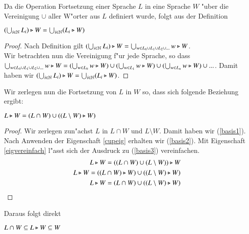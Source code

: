 Da die Operation Fortsetzung einer Sprache $L$ in eine Sprache $W$ "uber die Vereinigung $\cup$ aller W"orter aus $L$ definiert wurde, folgt aus der Definition

\vspace{2ex}

\begin{eigen}\label{cupeig}
$(\bigcup_{i\in\mathbb{N}} L_i) \triangleright W = \bigcup_{i\in\mathbb{N}} (L_i\triangleright W)$
\end{eigen}
\begin{proof} 
Nach Definition gilt $(\bigcup_{i\in\mathbb{N}} L_i) \triangleright W = \bigcup_{w\in L_0\cup L_1\cup L_2 \cup ... } w\triangleright W$.\\
Wir betrachten nun die Vereinigung f"ur jede Sprache, so dass $\bigcup_{w\in L_0\cup L_1\cup L_2 \cup ...} w\triangleright W = (\bigcup_{w\in L_0} w\triangleright W) \cup (\bigcup_{w\in L_1} w\triangleright W) \cup (\bigcup_{w\in L_n} w\triangleright W) \cup ...$. Damit haben wir $ (\bigcup_{i\in\mathbb{N}} L_i) \triangleright W  = \bigcup_{i\in\mathbb{N}} (L_i\triangleright W)$.
\end{proof}

Wir zerlegen nun die Fortsetzung von $L$ in $W$ so, dass sich folgende Beziehung ergibt:

\vspace{2ex}

\begin{eigen}\label{basiseigen}
$L\triangleright W = (L\cap W) \cup ((L\setminus W) \triangleright W)$
\end{eigen}
\begin{proof}
Wir zerlegen zun"achst $L$ in $L\cap W$ und $L\setminus W$. Damit haben wir (\ref{basis1}). 
Nach Anwenden der Eigenschaft \ref{cupeig} erhalten wir (\ref{basis2}). Mit Eigenschaft \ref{eigvereinfach} l"asst sich der Ausdruck zu (\ref{basis3}) vereinfachen.
\begin{eqnarray}
L\triangleright W = ((L\cap W) \cup (L\setminus W)) \triangleright W \label{basis1}\\
L\triangleright W = ((L\cap W) \triangleright W) \cup ((L\setminus W) \triangleright W) \label{basis2} \\
L\triangleright W = (L\cap W) \cup ((L\setminus W) \triangleright W) \label{basis3} 
\end{eqnarray}
\end{proof}

Daraus folgt direkt

\vspace{2ex}

\begin{folg}\label{klaro}
$L\cap W \subseteq L\triangleright W \subseteq W$
\end{folg}


